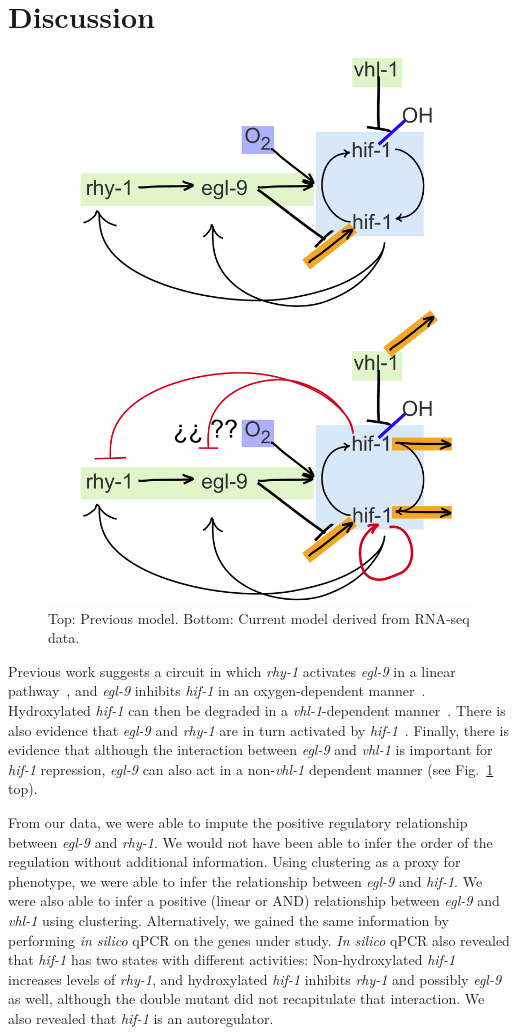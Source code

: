 \documentclass[9pt,twocolumn,twoside]{pnas-new}
\newcommand{\egl}{\emph{egl-9}}
\newcommand{\rhy}{\emph{rhy-1}}
\newcommand{\vhl}{\emph{vhl-1}}
\newcommand{\hif}{\emph{hif-1}}
\begin{document}
\section*{Discussion}
\begin{figure}[tbhp]
\centering
\includegraphics[width=.72\linewidth]{figs/new_model.pdf}
\caption{Top: Previous model. Bottom: Current model derived from RNA-seq data.}
\label{fig:newmodel}
\end{figure}

Previous work suggests a circuit in which \rhy{} activates \egl{} in a linear pathway~\cite{}, and \egl{} inhibits \hif{} in an oxygen-dependent manner~\cite{}. Hydroxylated \hif{} can then be degraded in a \vhl{}-dependent manner~\cite{}. There is also evidence that \egl{} and \rhy{} are in turn activated by \hif{}~\cite{}.
Finally, there is evidence that although the interaction between \egl{} and \vhl{} is important for \hif{} repression, \egl{} can also act in a non-\vhl{} dependent manner (see Fig.~\ref{fig:newmodel} top).

From our data, we were able to impute the positive regulatory relationship between \egl{} and \rhy{}. We would not have been able to infer the order of the regulation without additional information. Using clustering as a proxy for phenotype, we were able to infer the relationship between \egl{} and \hif{}. We were also able to infer a positive (linear or AND) relationship between \egl{} and \vhl{} using clustering. Alternatively, we gained the same information by performing \emph{in silico} qPCR on the genes under study. \emph{In silico} qPCR also revealed that \hif{} has two states with different activities: Non-hydroxylated \hif{} increases levels of \rhy{}, and hydroxylated \hif{} inhibits \rhy{} and possibly \egl{} as well, although the double mutant did not recapitulate that interaction. We also revealed that \hif{} is an autoregulator.
\end{document}
